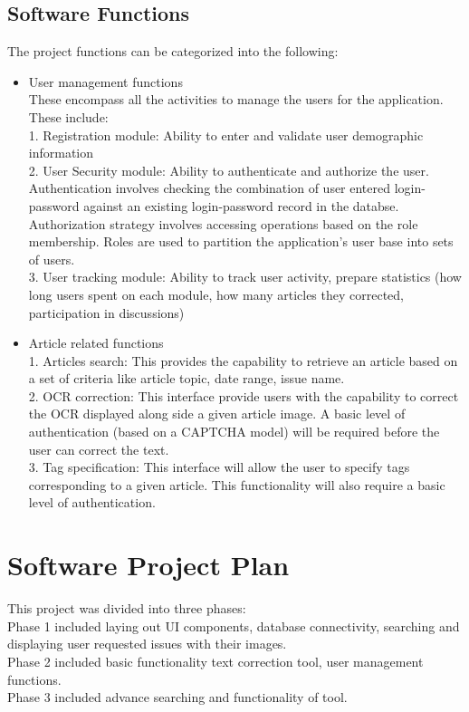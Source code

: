 \documentclass[12pt]{article}
\begin{document}
\subsection{Software Functions}
The project functions can be categorized into the following:
\begin{itemize}
\item User management functions \\
These encompass all the activities to manage the users for the application.  These include: \\
1.	Registration module: Ability to enter and validate user demographic information \\
2.	User Security module: Ability to authenticate and authorize the user.
Authentication involves checking the combination of user entered login-password against an existing login-password record in the databse.\\
Authorization strategy involves accessing operations based on the role membership. Roles are used to partition the application's user base into sets of users.\\
3.	User tracking module: Ability to track user activity, prepare statistics (how long users spent on each module, how many articles they corrected, participation in discussions) \\

\item Article related functions \\
1.	Articles search: This provides the capability to retrieve an article based on a set of criteria like article topic, date range, issue name. \\
2.	OCR correction: This interface provide users with the capability to correct the OCR displayed along side a given article image.  A basic level of authentication (based on a CAPTCHA model) will be required before the user can correct the text. \\
3.	Tag specification: This interface will allow the user to specify tags corresponding to a given article.  This functionality will also require a basic level of authentication. \\


\end{itemize}
\section{Software Project Plan}
\label{sec:plan}
This project was divided into three phases: \\
Phase 1 included laying out UI components, database connectivity, searching and displaying user requested issues with their images. \\
Phase 2 included basic functionality text correction tool, user management functions. \\
Phase 3 included advance searching and functionality of tool. \\
\end{document}
